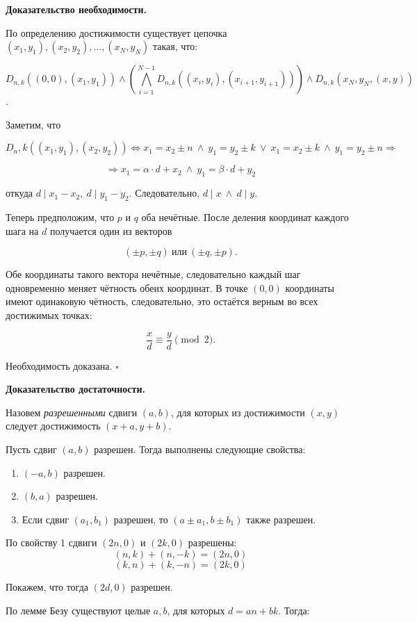 \textbf{Доказательство необходимости.}

По определению достижимости существует цепочка $(x_1, y_1), (x_2, y_2), \dots, (x_N, y_N)$ такая, что:

$$D_{n,k}((0,0), (x_1, y_1)) \wedge (\bigwedge \limits_{i = 1}^{N - 1} D_{n,k}((x_i, y_i), (x_{i + 1}, y_{i + 1}))) \wedge D_{n,k}({x_N, y_N}, (x,y))$$.

Заметим, что

$$D_n,k((x_1, y_1), (x_2, y_2)) \Leftrightarrow x_1 = x_2 \pm n\ \wedge\ y_1 = y_2 \pm k\ \vee\ x_1 = x_2 \pm k\ \wedge\ y_1 = y_2 \pm n \Rightarrow$$ 

$$\Rightarrow x_1 = \alpha \cdot d + x_2\ \wedge\ y_1 = \beta \cdot d + y_2$$

откуда $d \mid x_1 - x_2,\ d \mid y_1 - y_2$. Следовательно, $d \mid x\ \wedge\ d \mid y$.
\ms

Теперь предположим, что $p$ и $q$ оба нечётные. После деления координат
каждого шага на $d$ получается один из векторов

$$(\pm p,\pm q)\ \text{или}\ (\pm q,\pm p).$$

Обе координаты такого вектора нечётные, следовательно каждый шаг одновременно
меняет чётность обеих координат. В точке $(0,0)$ координаты имеют
одинаковую чётность, следовательно, это остаётся верным во всех
достижимых точках:

$$\frac{x}{d}\equiv\frac{y}{d}\pmod 2.$$

Необходимость доказана. \hfill $\square$
\bs

\textbf{Доказательство достаточности.}

Назовем \textit{разрешенными} сдвиги $(a, b)$, для которых из достижимости $(x,y)$ следует достижимость $(x + a, y + b)$.

Пусть сдвиг $(a, b)$ разрешен. Тогда выполнены следующие свойства:
\begin{enumerate}
    \item $(-a, b)$ разрешен.
    \item $(b, a)$ разрешен.
    \item Если сдвиг $(a_1, b_1)$ разрешен, то $(a \pm a_1, b \pm b_1)$ также разрешен.
\end{enumerate}

По свойству 1 сдвиги $(2n, 0)$ и $(2k, 0)$ разрешены:
$$(n,k) + (n,-k) = (2n,0)$$
$$(k,n) + (k,-n) = (2k,0)$$

Покажем, что тогда $(2d,0)$ разрешен.

По лемме Безу существуют целые $a,b$, для которых $d = an + bk$. Тогда: 

